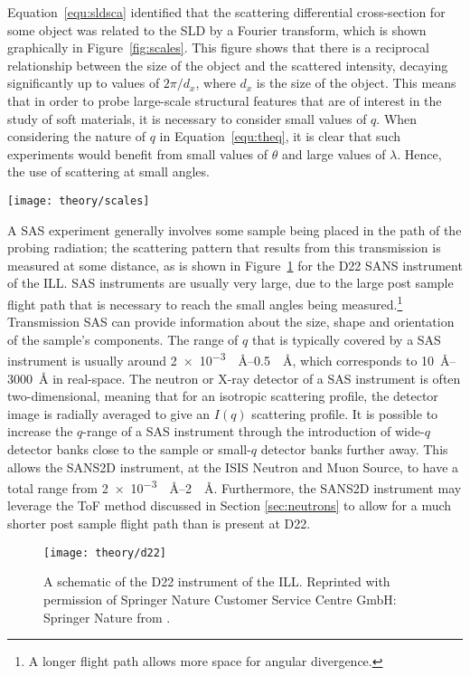 Equation~\ref{equ:sldsca} identified that the scattering differential cross-section for some object was related to the SLD by a Fourier transform, which is shown graphically in Figure~\ref{fig:scales}.
This figure shows that there is a reciprocal relationship between the size of the object and the scattered intensity, decaying significantly up to values of $2\pi/d_x$, where $d_x$ is the size of the object.
This means that in order to probe large-scale structural features that are of interest in the study of soft materials, it is necessary to consider small values of $q$.
When considering the nature of $q$ in Equation~\ref{equ:theq}, it is clear that such experiments would benefit from small values of $\theta$ and large values of $\lambda$.
Hence, the use of scattering at small angles.
%
\begin{marginfigure}
    \centering
    \texttt{[image: theory/scales]}
    \caption{The effect of a Fourier transform (a) the SLD profile for some object with a width of \SI{10}{\angstrom}, (b) the Fourier transform of this object showing the minima in the differential cross section at values of $\sfrac{2n\pi}{10}$, where $n$ is some integer.}
    \label{fig:scales}
\end{marginfigure}
%

A SAS experiment generally involves some sample being placed in the path of the probing radiation; the scattering pattern that results from this transmission is measured at some distance, as is shown in Figure~\ref{fig:sasgeo} for the D22 SANS instrument of the ILL.
SAS instruments are usually very large, due to the large post sample flight path that is necessary to reach the small angles being measured.\footnote{A longer flight path allows more space for angular divergence.}
Transmission SAS can provide information about the size, shape and orientation of the sample's components.
The range of $q$ that is typically covered by a SAS instrument is usually around \SIrange{2e-3}{0.5}{\per\angstrom}, which corresponds to \SIrange{10}{3000}{\angstrom} in real-space.
The neutron or X-ray detector of a SAS instrument is often two-dimensional, meaning that for an isotropic scattering profile, the detector image is radially averaged to give an $I(q)$ scattering profile.
It is possible to increase the $q$-range of a SAS instrument through the introduction of wide-$q$ detector banks close to the sample or small-$q$ detector banks further away.
This allows the SANS2D instrument, at the ISIS Neutron and Muon Source, to have a total range from \SIrange{2e-3}{2}{\per\angstrom}.
Furthermore, the SANS2D instrument may leverage the ToF method discussed in Section \ref{sec:neutrons} to allow for a much shorter post sample flight path than is present at D22.
%
\begin{figure}[t]
    \centering
    \texttt{[image: theory/d22]}
    \caption{A schematic of the D22 instrument of the ILL. Reprinted with permission of Springer Nature Customer Service Centre GmbH: Springer Nature from \cite{grillo_small-angle_2008}.}
    \label{fig:sasgeo}
\end{figure}
%

